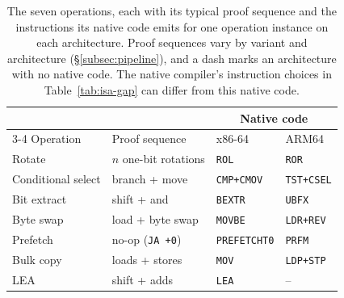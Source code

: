 \begin{table}[t]
\centering
\small
\setlength{\tabcolsep}{4pt}
\caption{The seven \lang operations, each with its typical proof sequence and the instructions its native code emits for one operation instance on each architecture. Proof sequences vary by variant and architecture (\S\ref{subsec:pipeline}), and a dash marks an architecture with no native code. The native compiler's instruction choices in Table~\ref{tab:isa-gap} can differ from this native code.}
\label{tab:descriptors}
\begin{tabular}{@{}llll@{}}
\toprule
 & & \multicolumn{2}{c}{Native code} \\
\cmidrule(lr){3-4}
Operation & Proof sequence & x86-64 & ARM64 \\
\midrule
Rotate & $n$ one-bit rotations & \texttt{ROL} & \texttt{ROR} \\
Conditional select & branch + move & \texttt{CMP+CMOV} & \texttt{TST+CSEL} \\
Bit extract & shift + and & \texttt{BEXTR} & \texttt{UBFX} \\
Byte swap & load + byte swap & \texttt{MOVBE} & \texttt{LDR+REV} \\
Prefetch & no-op (\texttt{JA +0}) & \texttt{PREFETCHT0} & \texttt{PRFM} \\
Bulk copy & loads + stores & \texttt{MOV} & \texttt{LDP+STP} \\
LEA & shift + adds & \texttt{LEA} & -- \\
\bottomrule
\end{tabular}
\end{table}